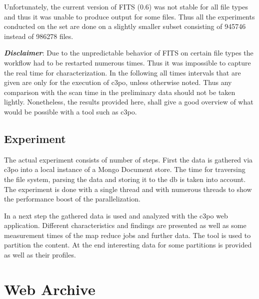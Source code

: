 Unfortunately, the current version of FITS (0.6) was not stable for all file types and thus it was unable to produce output for some files. Thus all the experiments conducted on the set are done on a slightly smaller subset consisting of 945746 instead of 986278 files.

\textbf{\textit{Disclaimer}}: Due to the unpredictable behavior of FITS on certain file types the workflow had to be restarted numerous times. Thus it was impossible to capture the real time for characterization. In the following all times intervals that are given are only for the execution of c3po, unless otherwise noted. Thus any comparison with the scan time in the preliminary data should not be taken lightly. Nonetheless, the results provided here, shall give a good overview of what would be possible with a tool such as c3po.

\subsection{Experiment}
The actual experiment consists of number of steps. First the data is gathered via c3po into a local instance of a Mongo Document store. The time for traversing the file system, parsing the data and storing it to the db is taken into account. The experiment is done with a single thread and with numerous threads to show the performance boost of the parallelization.

In a next step the gathered data is used and analyzed with the c3po web application. Different characteristics and findings are presented as well as some measurement times of the map reduce jobs and further data. The tool is used to partition the content. At the end interesting data for some partitions is provided as well as their profiles.

\section{Web Archive}